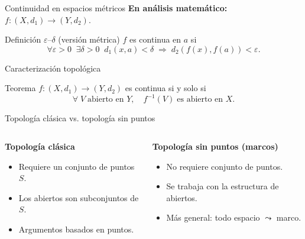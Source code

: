 \documentclass[compress,12pt]{beamer}
\begin{document}
\begin{frame}{Continuidad en espacios métricos}
  \textbf{En análisis matemático:} $f:(X,d_1)\to(Y,d_2)$.

  \begin{block}{Definición $\varepsilon$–$\delta$ (versión métrica)}
    $f$ es continua en $a$ si
    \[
      \forall \varepsilon>0 \;\; \exists \delta>0 \;\; 
      d_1(x,a)<\delta \;\Rightarrow\; d_2(f(x),f(a))<\varepsilon.
    \]
  \end{block}

\end{frame}

\begin{frame}{Caracterización topológica}
  \begin{block}{Teorema}
    $f:(X,d_1)\to(Y,d_2)$ es continua si y solo si 
    \[
      \forall\; V \;\text{abierto en } Y, \quad f^{-1}(V)\;\text{es abierto en } X.
    \]
  \end{block}


  \vspace{1em}

\end{frame}

\begin{frame}{Topología clásica vs. topología sin puntos}
  \begin{columns}[T,totalwidth=\textwidth]
    \begin{column}{0.48\textwidth}
      \textbf{Topología clásica}
      \begin{itemize}
        \item<1-> Requiere un conjunto de puntos $S$.
        \item<2-> Los abiertos son subconjuntos de $S$.
        \item<3-> Argumentos basados en puntos.
      \end{itemize}
    \end{column}
    \begin{column}{0.48\textwidth}
      \textbf{Topología sin puntos (marcos)}
      \begin{itemize}
        \item<4-> No requiere conjunto de puntos.
        \item<5-> Se trabaja con la estructura de abiertos.
        \item<6-> Más general: todo espacio $\leadsto$ marco.
      \end{itemize}
    \end{column}
  \end{columns}
\end{frame}
\end{document}
